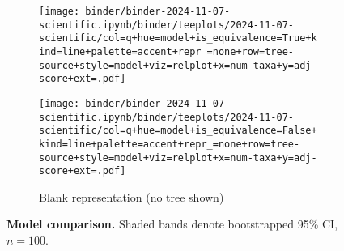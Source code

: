 \begin{figure*}
\begin{subfigure}{\textwidth}
\begin{minipage}[b]{0.7365\textwidth}
\texttt{[image: binder/binder-2024-11-07-scientific.ipynb/binder/teeplots/2024-11-07-scientific/col=q+hue=model+is\_equivalence=True+kind=line+palette=accent+repr\_=none+row=tree-source+style=model+viz=relplot+x=num-taxa+y=adj-score+ext=.pdf]}
\end{minipage}%
\begin{minipage}[b]{0.01\textwidth}
\end{minipage}
\begin{minipage}[b]{0.2535\textwidth}
\texttt{[image: binder/binder-2024-11-07-scientific.ipynb/binder/teeplots/2024-11-07-scientific/col=q+hue=model+is\_equivalence=False+kind=line+palette=accent+repr\_=none+row=tree-source+style=model+viz=relplot+x=num-taxa+y=adj-score+ext=.pdf]}
\end{minipage}
\caption{Blank representation (no tree shown)}
\label{fig:models:blank}
\end{subfigure}

\caption{
\textbf{Model comparison.}
Shaded bands denote bootstrapped 95\% CI, $n=100$.
}
\label{fig:models}

\end{figure*}
